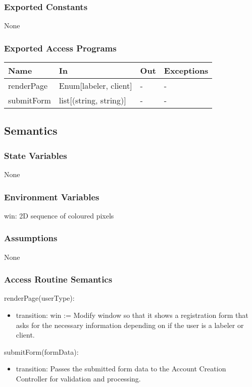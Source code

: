 \documentclass[12pt, titlepage]{article}
\begin{document}
\subsubsection{Exported Constants}
None
\subsubsection{Exported Access Programs}

\begin{center}
\begin{tabular}{p{2cm} p{4cm} p{4cm} p{2cm}}
\hline
\textbf{Name} & \textbf{In} & \textbf{Out} & \textbf{Exceptions} \\
\hline
renderPage & Enum[labeler, client] & - & - \\
submitForm & list[(string, string)] & - & - \\
\hline
\end{tabular}
\end{center}

\subsection{Semantics}

\subsubsection{State Variables}
None
\subsubsection{Environment Variables}
win: 2D sequence of coloured pixels

\subsubsection{Assumptions}
None

\subsubsection{Access Routine Semantics}

\noindent renderPage(userType):
\begin{itemize}
\item transition: win := Modify window so that it shows a registration form that asks for the necessary information depending on if the user is a labeler or client.
\end{itemize}

\noindent submitForm(formData):
\begin{itemize}
\item transition: Passes the submitted form data to the Account Creation Controller for validation and processing.
\end{itemize}
\end{document}
